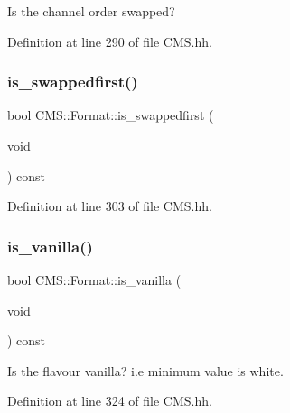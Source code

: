 Is the channel order swapped? 



Definition at line 290 of file C\+M\+S.\+hh.

\mbox{\label{class_c_m_s_1_1_format_a4e551b1ac30e7149d5bb7de19b80832e}} 
\subsubsection{\texorpdfstring{is\+\_\+swappedfirst()}{is\_swappedfirst()}}
{\footnotesize\ttfamily bool C\+M\+S\+::\+Format\+::is\+\_\+swappedfirst (\begin{DoxyParamCaption}\item[{void}]{ }\end{DoxyParamCaption}) const\hspace{0.3cm}{\ttfamily [inline]}}



Definition at line 303 of file C\+M\+S.\+hh.

\mbox{\label{class_c_m_s_1_1_format_a86988f817294b0efdcd7efd76f57e87a}} 
\subsubsection{\texorpdfstring{is\+\_\+vanilla()}{is\_vanilla()}}
{\footnotesize\ttfamily bool C\+M\+S\+::\+Format\+::is\+\_\+vanilla (\begin{DoxyParamCaption}\item[{void}]{ }\end{DoxyParamCaption}) const\hspace{0.3cm}{\ttfamily [inline]}}



Is the flavour \textquotesingle{}vanilla\textquotesingle{}? i.\+e minimum value is white. 



Definition at line 324 of file C\+M\+S.\+hh.

\mbox{\label{class_c_m_s_1_1_format_a18273f509a1a56a7783a7cbdddac4f4f}} 

